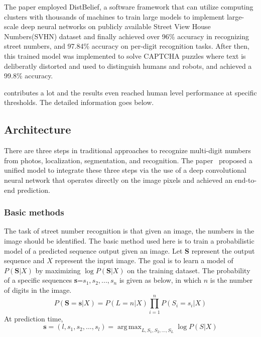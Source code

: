 \documentclass[conference]{IEEEtran}
\DeclareMathOperator*{\argmax}{arg\,max}
\begin{document}
The paper employed DistBelief, a software framework that can utilize computing clusters with thousands of machines to train large models\cite{disblief} to implement large-scale deep neural networks on publicly available Street View House Numbers(SVHN) dataset and finally achieved over 96\% accuracy in recognizing street numbers, and 97.84\% accuracy on per-digit recognition tasks. After then, this trained model was implemented to solve CAPTCHA puzzles where text is deliberatly distorted and used to distinguish humans and robots, and achieved a 99.8\% accuracy.

\cite{street} contributes a lot and the results even reached human level performance at specific thresholds. The detailed information goes below.


\subsection{Architecture}
There are three steps in
traditional approaches to recognize multi-digit numbers from photos, localization, segmentation, and recognition. 
The paper~\cite{street} proposed a unified model to integrate these three steps via the use of a deep convolutional neural network that operates directly on the image pixels and achieved an end-to-end prediction.
\subsubsection{Basic methods}
The task of street number recognition is that given an image, the numbers in the image should be identified. The basic method used here is to train a probabilistic model of a predicted sequence output given an image. Let \textbf{S} represent the output sequence and $X$ represent the input image. The goal is to learn a model of $P(\textbf{S}|X)$ by maximizing $\log P(\textbf{S}|X)$ on the training dataset. The probability of a specific sequences \textbf{s}=$s_1,s_2,...,s_n$ is given as below, in which $n$ is the number of digits in the image.
\begin{equation*}
    P(\textbf{S}=\textbf{s}|X)=P(L=n|X)\prod_{i=1}^nP(S_i=s_i|X)
\end{equation*}
At prediction time,
\begin{equation*}
    \textbf{s}=(l,s_1,s_2,...,s_l)=\argmax_{L,S_1,S_2,...,S_L}\log P(S|X)
\end{equation*}
\end{document}
